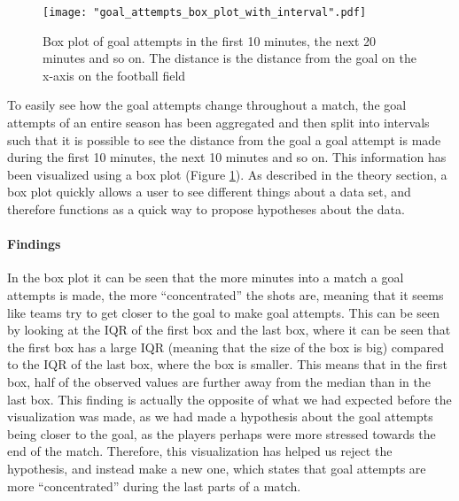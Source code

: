 \documentclass[Report.tex]{subfiles}
\begin{document}
\begin{figure}
\center
\texttt{[image: "goal\_attempts\_box\_plot\_with\_interval".pdf]}
\caption{Box plot of goal attempts in the first 10 minutes, the next 20 minutes and so on. The distance is the distance from the goal on the x-axis on the football field}
\label{Fig:goal_attempts_box_plot}
\end{figure}

To easily see how the goal attempts change throughout a match, the goal attempts of an entire season has been aggregated and then
split into intervals such that it is possible to see the distance from the goal a goal attempt is made during the first 10 minutes, the next
10 minutes and so on. This information has been visualized using a box plot (Figure \ref{Fig:goal_attempts_box_plot}). As described in the theory section, a box plot quickly allows a user to see different things about a data set, and therefore functions as a quick way to propose hypotheses about the data.

\paragraph{Findings\\}
In the box plot it can be seen that the more minutes into a match a goal attempts is made, the more ``concentrated'' the shots are, meaning that it seems like teams try to get closer to the goal to make goal attempts. This can be seen by looking at the IQR of the first box and the last box, where it can be seen that the first box has a large IQR (meaning that the size of the box is big) compared to the IQR of the last box, where the box is smaller. This means that in the first box, half of the observed values are further away from the median than in the last box. This finding is actually the opposite of what we had expected before the visualization was made, as we had made a hypothesis about the goal attempts being closer to the goal, as the players perhaps were more stressed towards the end of the match. Therefore, this visualization has helped us reject the hypothesis, and instead make a new one, which states that goal attempts are more ``concentrated'' during the last parts of a match.
 
\end{document}
